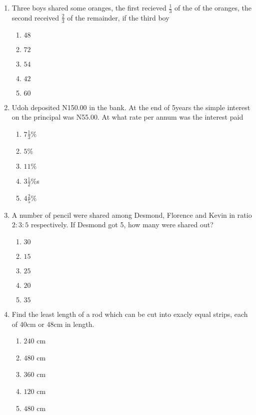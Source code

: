 \begin{multicols}{2}
\begin{enumerate}[label={\arabic*.}]
\begin{enumerate}[label={\Alph*.}]
    \end{enumerate}
\item Three boys shared some oranges, the first recieved \(\frac{1}{3}\) of the of the oranges, the second received \(\frac{2}{3}\) of the remainder, if the third boy
    \begin{enumerate}[label={\Alph*.}]
    \item \(48\)
    \item \(72\)
    \item \(54\)
    \item \(42\)
    \item \(60\)

    \end{enumerate}
\item Udoh deposited N150.00 in the bank. At the end of 5years the simple interest on the principal was N55.00. At what rate per annum was the interest paid 
    \begin{enumerate}[label={\Alph*.}]
    \item \(7\frac{1}{3}\%\)
    \item \(5\%\)
    \item \(11\%\)
    \item \(3\frac{1}{2}\%\)s
    \item \(4\frac{2}{5}\%\)

    \end{enumerate}
\item A number of pencil were shared among Desmond, Florence and Kevin in ratio \(2:3:5\) respectively. If Desmond got 5, how many were shared out?
    \begin{enumerate}[label={\Alph*.}]
    \item \(30\)
    \item \(15\)
    \item \(25\)
    \item \(20\)
    \item \(35\)

    \end{enumerate}
\item Find the least length of a rod which can be cut into exacly equal strips, each of 40cm or 48cm in length.
    \begin{enumerate}[label={\Alph*.}]
    \item \(240\) cm
    \item \(480\) cm
    \item \(360\) cm
    \item \(120\) cm
    \item \(480\) cm
    


\end{enumerate}
\end{enumerate}
\end{multicols}
